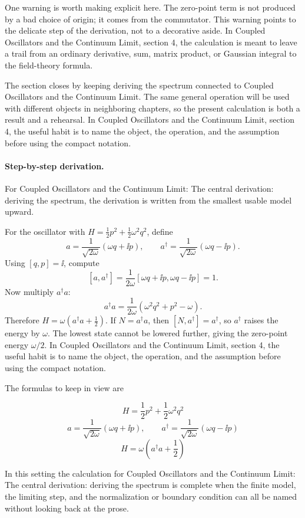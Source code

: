 One warning is worth making explicit here.  The zero-point term is not produced by a bad choice of origin; it comes from the commutator.  This warning points to the delicate step of the derivation, not to a decorative aside.  In Coupled Oscillators and the Continuum Limit, section 4, the calculation is meant to leave a trail from an ordinary derivative, sum, matrix product, or Gaussian integral to the field-theory formula.

The section closes by keeping deriving the spectrum connected to Coupled Oscillators and the Continuum Limit.  The same general operation will be used with different objects in neighboring chapters, so the present calculation is both a result and a rehearsal.  In Coupled Oscillators and the Continuum Limit, section 4, the useful habit is to name the object, the operation, and the assumption before using the compact notation.



\paragraph{Step-by-step derivation.}

For Coupled Oscillators and the Continuum Limit: The central derivation: deriving the spectrum, the derivation is written from the smallest usable model upward.

For the oscillator with \(H=\frac12p^2+\frac12\omega^2q^2\), define
\[
  a=\frac{1}{\sqrt{2\omega}}(\omega q+\ii p),\qquad
  a^\dagger=\frac{1}{\sqrt{2\omega}}(\omega q-\ii p).
\]
Using \([q,p]=\ii\), compute
\[
  [a,a^\dagger]
  =
  \frac{1}{2\omega}[\omega q+\ii p,\omega q-\ii p]=1.
\]
Now multiply \(a^\dagger a\):
\[
  a^\dagger a=\frac{1}{2\omega}(\omega^2q^2+p^2-\omega).
\]
Therefore \(H=\omega(a^\dagger a+\frac12)\).  If \(N=a^\dagger a\), then \([N,a^\dagger]=a^\dagger\), so \(a^\dagger\) raises the energy by \(\omega\).  The lowest state cannot be lowered further, giving the zero-point energy \(\omega/2\).  In Coupled Oscillators and the Continuum Limit, section 4, the useful habit is to name the object, the operation, and the assumption before using the compact notation.

The formulas to keep in view are

\[
  H=\frac12p^2+\frac12\omega^2q^2
\]
\[
  a=\frac{1}{\sqrt{2\omega}}(\omega q+\ii p),\qquad a^\dagger=\frac{1}{\sqrt{2\omega}}(\omega q-\ii p)
\]
\[
  H=\omega\left(a^\dagger a+\frac12\right)
\]

In this setting the calculation for Coupled Oscillators and the Continuum Limit: The central derivation: deriving the spectrum is complete when the finite model, the limiting step, and the normalization or boundary condition can all be named without looking back at the prose.




